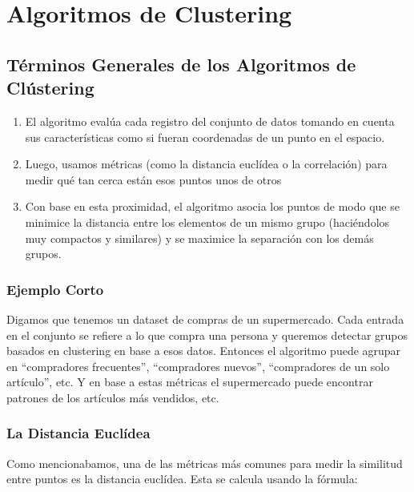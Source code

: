 \documentclass[
  spanish,
  letterpaper,
  DIV=11,
  numbers=noendperiod]{scrreprt}
\providecommand{\tightlist}{%
  \setlength{\itemsep}{0pt}\setlength{\parskip}{0pt}}
\begin{document}

\chapter{Algoritmos de Clustering}\label{algoritmos-de-clustering}

\section{Términos Generales de los Algoritmos de
Clústering}\label{tuxe9rminos-generales-de-los-algoritmos-de-cluxfastering}

\begin{enumerate}
\def\labelenumi{\arabic{enumi}.}
\tightlist
\item
  El algoritmo evalúa cada registro del conjunto de datos tomando en
  cuenta sus características como si fueran coordenadas de un punto en
  el espacio.
\item
  Luego, usamos métricas (como la distancia euclídea o la correlación)
  para medir qué tan cerca están esos puntos unos de otros
\item
  Con base en esta proximidad, el algoritmo asocia los puntos de modo
  que se minimice la distancia entre los elementos de un mismo grupo
  (haciéndolos muy compactos y similares) y se maximice la separación
  con los demás grupos.
\end{enumerate}

\subsection{Ejemplo Corto}\label{ejemplo-corto}

Digamos que tenemos un dataset de compras de un supermercado. Cada
entrada en el conjunto se refiere a lo que compra una persona y queremos
detectar grupos basados en clustering en base a esos datos. Entonces el
algoritmo puede agrupar en ``compradores frecuentes'', ``compradores
nuevos'', ``compradores de un solo artículo'', etc. Y en base a estas
métricas el supermercado puede encontrar patrones de los artículos más
vendidos, etc.

\subsection{La Distancia Euclídea}\label{la-distancia-eucluxeddea}

Como mencionabamos, una de las métricas más comunes para medir la
similitud entre puntos es la distancia euclídea. Esta se calcula usando
la fórmula:
\end{document}
